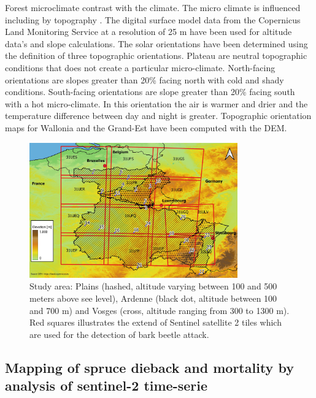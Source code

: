 \documentclass[3p,procedia]{elsarticle}
\begin{document}
Forest microclimate contrast with the climate.
The micro climate is influenced including by topography \citep{de_frenne_forest_2021}.
The digital surface model data from the Copernicus Land Monitoring Service \citep{DEM_copernicus} at a resolution of 25 m have been used for altitude data's and slope calculations.
The solar orientations have been determined using the \cite{Delvaux_galoux} definition of three topographic orientations.
Plateau are neutral topographic conditions that does not create a particular micro-climate. 
North-facing orientations are slopes greater than  20\% facing north with cold and shady conditions.
South-facing orientations are slope greater than  20\% facing south with a hot micro-climate.
In this orientation the air is warmer and drier and the temperature difference between day and night is greater.
Topographic orientation maps for Wallonia and the Grand-Est have been computed with the DEM. 


\begin{figure} [htbp] 
	\centering
	\includegraphics[width=0.8\textwidth]{gde.jpeg}
	\caption{Study area: Plains (hashed, altitude varying between 100 and 500 meters above see level), Ardenne (black dot, altitude between 100 and 700 m) and Vosges (cross, altitude ranging from 300 to 1300 m). Red squares illustrates the extend of Sentinel satellite 2 tiles which are used for the detection of bark beetle attack.}
	\label{fig:situ}
\end{figure}

\subsection{Mapping of spruce dieback and mortality by analysis of sentinel-2 time-serie}
\end{document}
